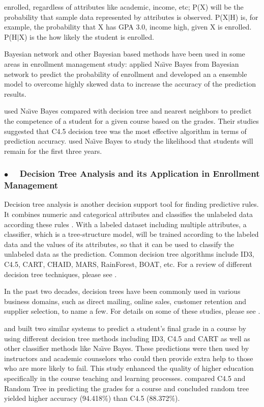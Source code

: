 \documentclass[12pt,english]{report}
\begin{document}
enrolled, regardless of attributes like academic, income, etc; P(X) will be the
probability that sample data represented by attributes is observed. P(X$|$H)
is, for example, the probability that X has GPA 3.0, income high, given X is
enrolled.  P(H$|$X) is the how likely the student is enrolled.

Bayesian network and other Bayesian based methods have been used in some areas
in enrollment management study:
\citet{optimization_bayesian} applied Na{\"\i}ve Bayes from Bayesian network to
predict the probability of enrollment and developed an  a ensemble model to
overcome highly skewed data to increase the accuracy of the prediction results.

\citet{dt_enroll_academic} used Na{\"\i}ve Bayes compared with decision tree
and nearest neighbors to predict the competence of a student for a given course
based on the grades. Their studies suggested that C4.5 decision tree was  the
most effective algorithm in terms of prediction accuracy.
\citet{nandeshwarlearning2011} used Na{\"\i}ve Bayes to study the likelihood
that students will remain for the first three years.

\subsubsection{$\bullet \quad$  Decision Tree Analysis and its Application in
Enrollment Management}
Decision tree analysis is another decision support tool for finding predictive
rules. It combines numeric and categorical attributes and classifies the
unlabeled data according these rules \citep{Han2011}. With a labeled dataset
including multiple attributes, a classifier, which is a tree-structure model,
will be trained according to the labeled data and the values of its attributes,
so that it can be used to classify the unlabeled data as the prediction. Common
decision tree algorithms include ID3, C4.5, CART, CHAID, MARS, RainForest,
BOAT, etc.  For a review of different decision tree techniques, please see
\citep{Loh2011}.

In the past two decades, decision trees have been commonly used in various
business domains, such as direct mailing, online sales, customer retention and
supplier selection, to name a few.  For details on some of these studies,
please see \citep{Berry2004}.

\citet{dt_performance} and \citet{dt_performance1} built two similar systems to
predict a student's final grade in a course by using different decision tree
methods including ID3, C4.5 and CART as well as other classifier methods like
Na{\"\i}ve Bayes. These  predictions were then used by instructors and academic
counselors who could then provide extra help to those who are more likely to
fail. This study enhanced the quality of higher education specifically in the
course teaching and learning processes. \citet{dt_performance2} compared C4.5
and Random Tree in predicting the grades for a course and concluded random tree
yielded higher accuracy (94.418\%) than C4.5 (88.372\%).
\end{document}
